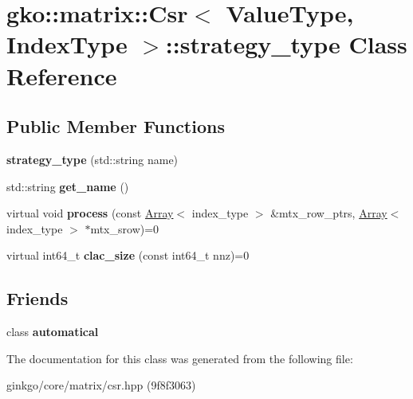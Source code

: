 \hypertarget{classgko_1_1matrix_1_1Csr_1_1strategy__type}{}\section{gko\+:\+:matrix\+:\+:Csr$<$ Value\+Type, Index\+Type $>$\+:\+:strategy\+\_\+type Class Reference}
\label{classgko_1_1matrix_1_1Csr_1_1strategy__type}
\subsection*{Public Member Functions}
\begin{DoxyCompactItemize}
\item 
\mbox{\label{classgko_1_1matrix_1_1Csr_1_1strategy__type_aae6804f7a0b899f03bc0d5e0f139129c}} 
{\bfseries strategy\+\_\+type} (std\+::string name)
\item 
\mbox{\label{classgko_1_1matrix_1_1Csr_1_1strategy__type_a0c22b251b0c1dfd087a5c097488febe0}} 
std\+::string {\bfseries get\+\_\+name} ()
\item 
\mbox{\label{classgko_1_1matrix_1_1Csr_1_1strategy__type_a58bda9208766e57d861262d4059b65b4}} 
virtual void {\bfseries process} (const \hyperlink{classgko_1_1Array}{Array}$<$ index\+\_\+type $>$ \&mtx\+\_\+row\+\_\+ptrs, \hyperlink{classgko_1_1Array}{Array}$<$ index\+\_\+type $>$ $\ast$mtx\+\_\+srow)=0
\item 
\mbox{\label{classgko_1_1matrix_1_1Csr_1_1strategy__type_a07a6dda9dd04ed8abd914f3a69f330f2}} 
virtual int64\+\_\+t {\bfseries clac\+\_\+size} (const int64\+\_\+t nnz)=0
\end{DoxyCompactItemize}
\subsection*{Friends}
\begin{DoxyCompactItemize}
\item 
\mbox{\label{classgko_1_1matrix_1_1Csr_1_1strategy__type_a9e1e07b9f14479534a4043eefd6320cc}} 
class {\bfseries automatical}
\end{DoxyCompactItemize}


The documentation for this class was generated from the following file\+:\begin{DoxyCompactItemize}
\item 
ginkgo/core/matrix/csr.\+hpp (9f8f3063)\end{DoxyCompactItemize}
